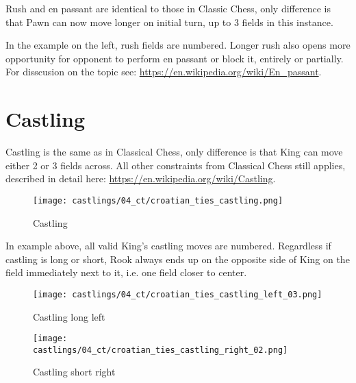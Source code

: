 Rush and en passant are identical to those in Classic Chess, only difference is that Pawn
can now move longer on initial turn, up to 3 fields in this instance.

In the example on the left, rush fields are numbered. Longer rush also opens more opportunity
for opponent to perform en passant or block it, entirely or partially. For disscusion on the
topic see:
\href{https://en.wikipedia.org/wiki/En\_passant}{https://en.wikipedia.org/wiki/En\_passant}.

\clearpage %

\section*{Castling}

Castling is the same as in Classical Chess, only difference is that King can move either 2 or 3
fields across. All other constraints from Classical Chess still applies, described in detail here:
\href{https://en.wikipedia.org/wiki/Castling}{https://en.wikipedia.org/wiki/Castling}.

\noindent
\begin{figure}[!h]
\texttt{[image: castlings/04\_ct/croatian\_ties\_castling.png]}
\caption{Castling}
\label{fig:croatian_ties_castling}
\end{figure}

In example above, all valid King's castling moves are numbered. Regardless if castling is long or short,
Rook always ends up on the opposite side of King on the field immediately next to it, i.e. one field closer
to center.

\noindent
\begin{figure}[!h]
\texttt{[image: castlings/04\_ct/croatian\_ties\_castling\_left\_03.png]}
\caption{Castling long left}
\label{fig:croatian_ties_castling_left_03}
\end{figure}

\noindent
\begin{figure}[!h]
\texttt{[image: castlings/04\_ct/croatian\_ties\_castling\_right\_02.png]}
\caption{Castling short right}
\label{fig:croatian_ties_castling_right_02}
\end{figure}

